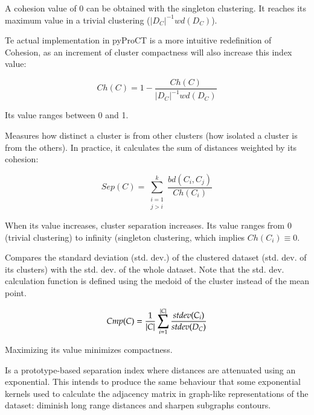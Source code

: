 A cohesion value of 0 can be obtained with the singleton clustering.
It reaches its maximum value in a trivial clustering ($|D_{C}|^{-1}wd(D_{C})$).

Te actual implementation in pyProCT is a more intuitive redefinition of Cohesion, as 
an increment of cluster compactness will also increase this index value:

\begin{equation}
Ch(C)=1-\frac{Ch(C)}{|D_{C}|^{-1}wd(D_{C})}
\end{equation}

Its value ranges between 0 and 1.



Measures how distinct a cluster is from other clusters (how isolated
a cluster is from the others). In practice, it calculates the sum
of distances weighted by its cohesion:

\begin{equation} Sep(C)=\sum_{\substack{i=1\\ j>i}}^{k} \frac{bd(C_i,C_j)}{Ch(C_i)} \end{equation}

When its value increases, cluster separation increases. Its value
ranges from 0 (trivial clustering) to infinity (singleton clustering,
which implies $Ch(C_{i})\equiv0$.


Compares the standard deviation (std. dev.) of the clustered dataset
(std. dev. of its clusters) with the std. dev. of the whole dataset.
Note that the std. dev. calculation function is defined using the
medoid of the cluster instead of the mean point.

\begin{equation}
Cmp(C)=\frac{1}{\lvert C\rvert}\sum_{i=1}^{|C|}\frac{stdev(C_{i})}{stdev(D_{C})}
\end{equation}


Maximizing its value minimizes compactness.



Is a prototype-based separation index where distances are attenuated
using an exponential. This intends to produce the same behaviour that
some exponential kernels used to calculate the adjacency matrix in
graph-like representations of the dataset: diminish long range distances
and sharpen subgraphs contours.

